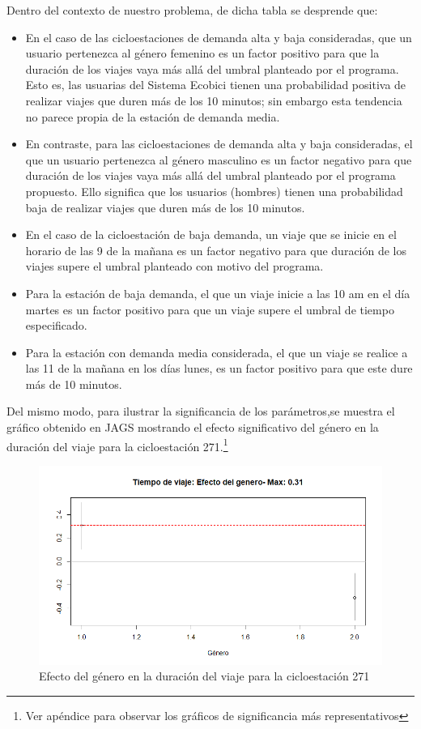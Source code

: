 \documentclass[9pt,twocolumn,twoside]{ilcss}
\begin{document}
Dentro del contexto de nuestro problema, de dicha tabla se desprende que:
\begin{itemize}
    \item En el caso de las cicloestaciones de demanda alta y baja consideradas, que un usuario pertenezca al género femenino es un factor positivo para que la duración de los viajes vaya más allá del umbral planteado por el programa. Esto es, las usuarias del Sistema Ecobici tienen una probabilidad positiva de realizar viajes que duren más de los 10 minutos; sin embargo esta tendencia no parece propia de la estación de demanda media.
    \item En contraste, para las cicloestaciones de demanda alta y baja consideradas, el que un usuario pertenezca al género masculino es un factor negativo para que duración de los viajes vaya más allá del umbral planteado por el programa propuesto. Ello significa que los usuarios (hombres) tienen una probabilidad baja de realizar viajes que duren más de los 10 minutos.
    \item En el caso de la cicloestación de baja demanda, un viaje que se inicie en el horario de las 9 de la mañana es un factor negativo para que duración de los viajes supere el umbral planteado con motivo del programa.
    \item Para la estación de baja demanda, el que un viaje inicie a las 10 am en el día martes es un factor positivo para que un viaje supere el umbral de tiempo especificado.
    \item Para la estación con demanda media considerada, el que un viaje se realice a las 11 de la mañana en los días lunes, es un factor positivo para que este dure más de 10 minutos.
    \end{itemize}

Del mismo modo, para ilustrar la significancia de los parámetros,se muestra el gráfico obtenido en JAGS mostrando el efecto significativo del género en la duración del viaje para la cicloestación 271.\footnote{Ver apéndice para observar los gráficos de significancia más representativos}

\begin{figure}[tbhp]
	\centering
	\includegraphics[width=0.9\linewidth]{Paper/images/271_efecto_genero.png}
	\caption{ Efecto del género en la duración del viaje para la cicloestación 271 }
	\label{fig:pen_habs_penb271gen1}
\end{figure}
\end{document}
